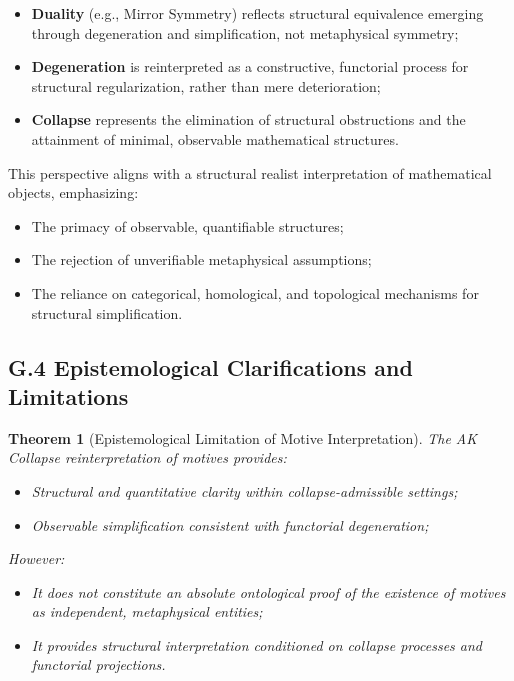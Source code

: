 \documentclass[11pt]{article}
\newtheorem{theorem}{Theorem}[section]
\begin{document}
\begin{itemize}
    \item \textbf{Duality} (e.g., Mirror Symmetry) reflects structural equivalence emerging through degeneration and simplification, not metaphysical symmetry;
    \item \textbf{Degeneration} is reinterpreted as a constructive, functorial process for structural regularization, rather than mere deterioration;
    \item \textbf{Collapse} represents the elimination of structural obstructions and the attainment of minimal, observable mathematical structures.
\end{itemize}

This perspective aligns with a structural realist interpretation of mathematical objects, emphasizing:

\begin{itemize}
    \item The primacy of observable, quantifiable structures;
    \item The rejection of unverifiable metaphysical assumptions;
    \item The reliance on categorical, homological, and topological mechanisms for structural simplification.
\end{itemize}

\subsection*{G.4 Epistemological Clarifications and Limitations}

\begin{theorem}[Epistemological Limitation of Motive Interpretation]
The AK Collapse reinterpretation of motives provides:

\begin{itemize}
    \item Structural and quantitative clarity within collapse-admissible settings;
    \item Observable simplification consistent with functorial degeneration;
\end{itemize}

However:

\begin{itemize}
    \item It does not constitute an absolute ontological proof of the existence of motives as independent, metaphysical entities;
    \item It provides structural interpretation conditioned on collapse processes and functorial projections.
\end{itemize}
\end{theorem}
\end{document}
